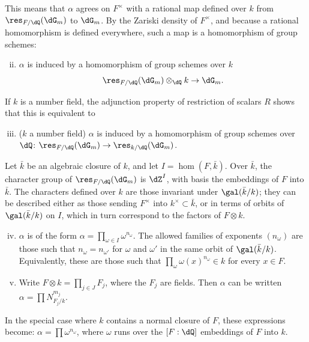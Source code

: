 \documentclass[oneside]{book}
\begin{document}
This means that $\alpha$ agrees on $F^\times$ with a rational map defined over $k$ 
from $\res_{F/\dQ}(\dG_m)$ to $\dG_m$. By the Zariski density of 
$F^\times$, and because a rational homomorphism is defined everywhere, such 
a map is a homomorphism of group schemes: 
\begin{enumerate}[(i)]
\setcounter{enumi}{1}
  \item $\alpha$ is induced by a homomorphism of group schemes over $k$ 
    \[
      \res_{F/\dQ}(\dG_m)\otimes_\dQ k \to \dG_m \text{.} 
    \] 
\end{enumerate}

If $k$ is a number field, the adjunction property of restriction of 
scalars $R$ shows that this is equivalent to 
\begin{enumerate}[(i)]
\setcounter{enumi}{2}
  \item ($k$ a number field) $\alpha$ is induced by a homomorphism of 
    group schemes over $\dQ$: $\res_{F/\dQ}(\dG_m) \to \res_{k/\dQ}(\dG_m)$. 
\end{enumerate}

Let $\bar k$ be an algebraic closure of $k$, and let $I=\hom(F,\bar k)$. Over 
$\bar k$, the character group of $\res_{F/\dQ}(\dG_m)$ is $\dZ^I$, with basis 
the embeddings of $F$ into $\bar k$. The characters defined over $k$ 
are those invariant under $\gal(\bar k/k)$; they can be described either as 
those sending $F^\times$ into $k^\times\subset \bar k$, or in terms of 
orbits of $\gal(\bar k/k)$ on $I$, which in turn correspond to the factors of 
$F\otimes k$. 
\begin{enumerate}[(i)]
\setcounter{enumi}{3}
  \item $\alpha$ is of the form 
    $\alpha=\prod_{\omega\in I} \omega^{n_\omega}$. The allowed families of exponents 
    $(n_\omega)$ are those such that $n_\omega=n_{\omega'}$ for 
    $\omega$ and $\omega'$ in the same orbit of $\gal(\bar k/k)$. Equivalently, these 
    are those such that $\prod_\omega \omega(x)^{n_\omega}\in k$ for every 
    $x\in F$. 
  \item Write $F\otimes k=\prod_{j\in J} F_j$, where the $F_j$ are fields. 
    Then $\alpha$ can be written $\alpha=\prod N_{F_j/k}^{m_j}$. 
\end{enumerate}

In the special case where $k$ contains a normal closure of $F$, these 
expressions become: $\alpha=\prod \omega^{n_\omega}$, where $\omega$ 
runs over the $[F:\dQ]$ embeddings of $F$ into $k$. 
\end{document}
